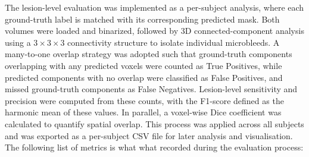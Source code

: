 \documentclass{aifyp}
\begin{document}
The lesion-level evaluation was implemented as a per-subject analysis, where each ground-truth label is matched with its corresponding predicted mask. Both volumes were loaded and binarized, followed by 3D connected-component analysis using a $3\times3\times3$ connectivity structure to isolate individual microbleeds. A many-to-one overlap strategy was adopted such that ground-truth components overlapping with any predicted voxels were counted as True Positives, while predicted components with no overlap were classified as False Positives, and missed ground-truth components as False Negatives. Lesion-level sensitivity and precision were computed from these counts, with the F1-score defined as the harmonic mean of these values. In parallel, a voxel-wise Dice coefficient was calculated to quantify spatial overlap. This process was applied across all subjects and was exported as a per-subject CSV file for later analysis and visualisation.
\\

The following list of metrics is what what recorded during the evaluation process:
\end{document}
